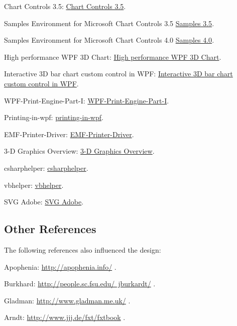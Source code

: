 Chart Controls 3.5: \href{http://www.microsoft.com/en-us/download/details.aspx?id=14422}{Chart Controls 3.5}.

Samples Environment for Microsoft Chart Controls 3.5 \href{http://archive.msdn.microsoft.com/mschart/Release/ProjectReleases.aspx?ReleaseId=1591}{Samples 3.5}.

Samples Environment for Microsoft Chart Controls 4.0 \href{http://archive.msdn.microsoft.com/mschart/Release/ProjectReleases.aspx?ReleaseId=4418}{Samples 4.0}.

High performance WPF 3D Chart: \href{http://www.codeproject.com/Articles/42174/High-performance-WPF-D-Chart}{High performance WPF 3D Chart}.

Interactive 3D bar chart custom control in WPF: \href{http://www.codeproject.com/Articles/29151/Interactive-D-bar-chart-custom-control-in-WPF-wit}{Interactive 3D bar chart custom control in WPF}.

WPF-Print-Engine-Part-I: \href{http://www.codeproject.com/Articles/238135/WPF-Print-Engine-Part-I}{WPF-Print-Engine-Part-I}.

Printing-in-wpf: \href{http://tech.pro/tutorial/881/printing-in-wpf}{printing-in-wpf}.

EMF-Printer-Driver: \href{http://www.softpedia.com/get/Office-tools/Other-Office-Tools/EMF-Printer-Driver.shtml}{EMF-Printer-Driver}.

3-D Graphics Overview: \href{http://msdn.microsoft.com/en-us/library/ms747437%28v=vs.100%29.aspx}{3-D Graphics Overview}.
	
	csharphelper: \href{http://www.csharphelper.com/}{csharphelper}.
	
	vbhelper: \href{http://www.vb-helper.com/index.html}{vbhelper}.
	
	SVG Adobe: \href{http://www.iegallery.com/en-gb/Addons/Details/444}{SVG Adobe}.
	
	
	\subsection{Other References}
	The following references also influenced the design:
	
	Apophenia: \href{http://apophenia.info/}{http://apophenia.info/} .
	
	Burkhard: \href{http://people.sc.fsu.edu/~jburkardt/}{http://people.sc.fsu.edu/~jburkardt/} .
	
	Gladman: \href{http://www.gladman.me.uk/}{http://www.gladman.me.uk/} .
	
	Arndt: \href{http://www.jjj.de/fxt/#fxtbook}{http://www.jjj.de/fxt/fxtbook} .
	
